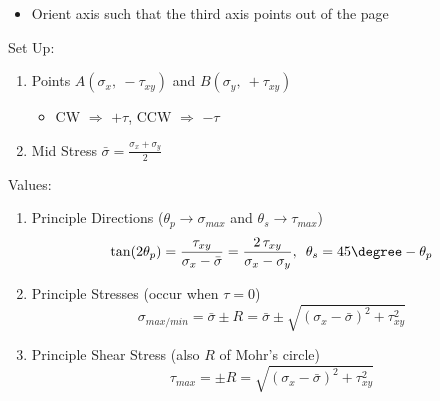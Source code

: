 \begin{itemize}
    \item Orient axis such that the third axis points out of the page
\end{itemize}
Set Up:
\begin{enumerate}
    \item Points $A(\sigma_x,\ -\tau_{xy})$ and $B(\sigma_y,\ +\tau_{xy})$
    \begin{itemize}
        \item  CW $\Rightarrow $ $+\tau$, CCW $\Rightarrow $ $-\tau$
    \end{itemize}
    \item Mid Stress $\bar{\sigma} = \frac{\sigma_x+\sigma_y}{2}$
\end{enumerate}
Values:
\begin{enumerate}
        \item Principle Directions ($\theta_p\rightarrow\sigma_{max}$ and $\theta_s\rightarrow\tau_{max}$)
        \begin{align*}
            \tan(2\theta_p) = \frac{\tau_{xy}}{\sigma_{x} -\bar{\sigma}}= \frac{2\,\tau_{xy}}{\sigma_{x} -\sigma_{y}},  \hspace {5pt} \theta_s = 45\degree -\theta_p
        \end{align*}
        \item Principle Stresses (occur when $\tau=0$)
        \begin{equation*}
            \sigma_{max/min} = \bar{\sigma}\pm R=\bar\sigma \pm \sqrt{\left(\sigma_x-\bar\sigma \right)^2+\tau_{xy}^2}
        \end{equation*}
        \item Principle Shear Stress (also $R$ of Mohr's circle)
        \begin{equation*}
            \tau_{max}=\pm R =\sqrt{\left(\sigma_x-\bar\sigma \right)^2+\tau_{xy}^2}
        \end{equation*}
    \end{enumerate}

